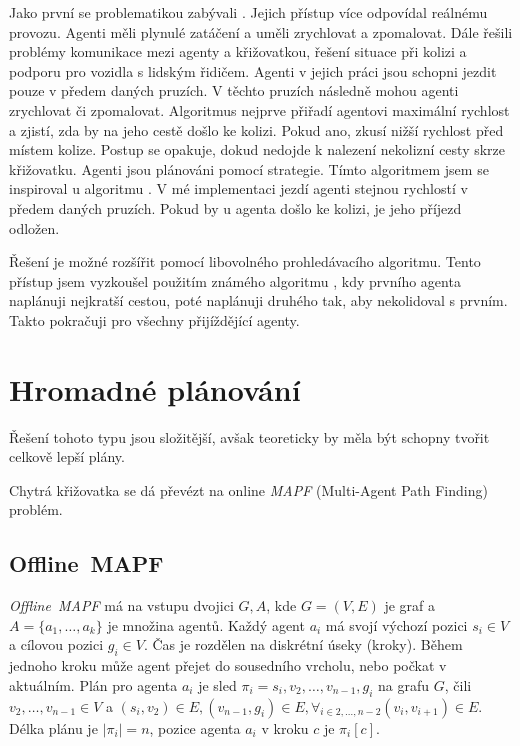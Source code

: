 Jako první se problematikou zabývali \citet*{Dresner}.
Jejich přístup více odpovídal reálnému provozu.
Agenti měli plynulé zatáčení a uměli zrychlovat a zpomalovat.
Dále \citet{Dresner} řešili problémy komunikace mezi agenty a křižovatkou, řešení situace při kolizi a podporu pro vozidla s lidským řidičem.
Agenti v jejich práci jsou schopni jezdit pouze v předem daných pruzích.
V těchto pruzích následně mohou agenti zrychlovat či zpomalovat.
Algoritmus nejprve přiřadí agentovi maximální rychlost a zjistí, zda by na jeho cestě došlo ke kolizi.
Pokud ano, zkusí nižší rychlost před místem kolize.
Postup se opakuje, dokud nedojde k nalezení nekolizní cesty skrze křižovatku.
Agenti jsou plánováni pomocí  strategie.
Tímto algoritmem jsem se inspiroval u algoritmu .
V mé implementaci jezdí agenti stejnou rychlostí v předem daných pruzích.
Pokud by u agenta došlo ke kolizi, je jeho příjezd odložen.

Řešení je možné rozšířit pomocí libovolného prohledávacího algoritmu.
Tento přístup jsem vyzkoušel použitím známého algoritmu ,
kdy prvního agenta naplánuji nejkratší cestou, poté naplánuji druhého tak, aby nekolidoval s prvním.
Takto pokračuji pro všechny přijíždějící agenty.

\section{Hromadné plánování}\label{sec:hromadne_planovani}

Řešení tohoto typu jsou složitější, avšak teoreticky by měla být schopny tvořit celkově lepší plány.

Chytrá křižovatka se dá převézt na online \emph{MAPF} (Multi-Agent Path Finding) problém.

\subsection{Offline~MAPF}\label{subsec:offline-mapf}

\emph{Offline~MAPF} má na vstupu dvojici $G, A$, kde $G=(V, E)$ je graf a $A = \{a_1, \dots, a_k\}$ je množina agentů.
Každý agent $a_i$ má svojí výchozí pozici $s_i \in V$ a cílovou pozici $g_i \in V$.
Čas je rozdělen na diskrétní úseky (kroky).
Během jednoho kroku může agent přejet do sousedního vrcholu, nebo počkat v aktuálním.
Plán pro agenta $a_i$ je sled $\pi_i = s_i, v_2, \dots, v_{n-1}, g_i$ na grafu $G$, čili $v_2, \dots, v_{n-1} \in V$ a
$(s_i, v_2) \in E, (v_{n-1}, g_i) \in E, \forall_{i \in 2, \dots, n-2} (v_i, v_{i+1}) \in E$.
Délka plánu je $|\pi_i| = n$, pozice agenta $a_i$ v kroku $c$ je $\pi_i[c]$.

